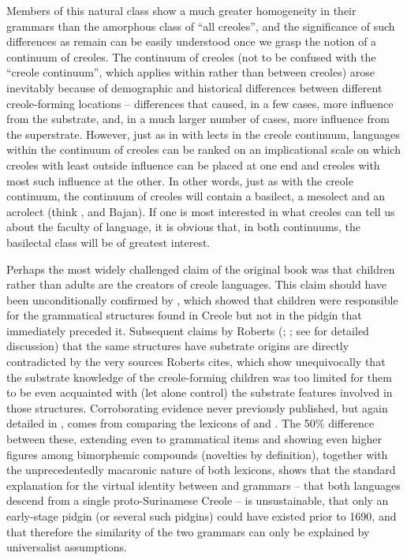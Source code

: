 Members of this natural class show a much greater homogeneity in their grammars than the amorphous class of “all creoles”, and the significance of such differences as remain can be easily understood once we grasp the notion of a continuum of creoles. The continuum of creoles (not to be confused with the “creole continuum”, which applies within rather than between creoles) arose inevitably because of demographic and historical differences between different creole-forming locations -- differences that caused, in a few cases, more influence from the substrate, and, in a much larger number of cases, more influence from the superstrate. However, just as in with lects in the creole continuum, languages within the continuum of creoles can be ranked on an implicational scale on which creoles with least outside influence can be placed at one end and creoles with most such influence at the other. In other words, just as with the creole continuum, the continuum of creoles will contain a basilect, a mesolect and an acrolect (think ,  and Bajan). If one is most interested in what creoles can tell us about the faculty of language, it is obvious that, in both continuums, the basilectal class will be of greatest interest.

Perhaps the most widely challenged claim of the original book was that children rather than adults are the creators of creole languages. This claim should have been unconditionally confirmed by \citet{Roberts1998}, which showed that children were responsible for the grammatical structures found in  Creole but not in the pidgin that immediately preceded it. Subsequent claims by Roberts (\citeyear{Roberts2000}; \citeyear{Roberts2004}; see \citealt{Bickerton2014} for detailed discussion) that the same structures have substrate origins are directly contradicted by the very sources Roberts cites, which show unequivocally that the substrate knowledge of the creole-forming children was too limited for them to be even acquainted with (let alone control) the substrate features involved in those structures. Corroborating evidence never previously published, but again detailed in \citet{Bickerton2014}, comes from comparing the lexicons of  and . The 50\% difference between these, extending even to grammatical items and showing even higher figures among bimorphemic compounds (novelties by definition), together with the unprecedentedly macaronic nature of both lexicons, shows that the standard explanation for the virtual identity between  and  grammars -- that both languages descend from a single proto-Surinamese Creole -- is unsustainable, that only an early-stage pidgin (or several such pidgins) could have existed prior to 1690, and that therefore the similarity of the two grammars can only be explained by universalist assumptions. 

